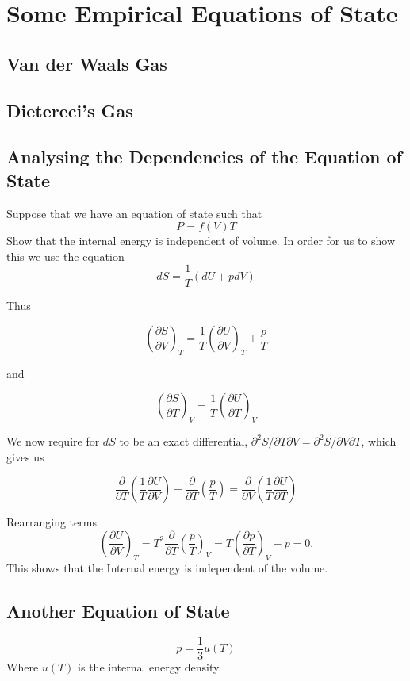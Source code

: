 \documentclass[10pt,twoside,openright]{memoir}
\begin{document}
\section{Some Empirical Equations of State}

\subsection{Van der Waals Gas}

\subsection{Dietereci's Gas}

\subsection{Analysing the Dependencies of the Equation of State}
Suppose that we have an equation of state such that
$$
P = f(V) T
$$
Show that the internal energy is independent of volume. In order for us to show this we use the equation
$$
dS = \frac{1}{T} \left( dU + pdV \right)
$$

Thus

$$
\left( \frac{\partial S}{\partial V} \right)_T 
= \frac{1}{T} \left( \frac{\partial U}{\partial V} \right)_T +  \frac{p}{T}
$$

and

$$
\left( \frac{\partial S}{\partial T} \right)_V 
= \frac{1}{T} \left( \frac{\partial U}{\partial T} \right)_V
$$

We now require for $dS$ to be an exact differential, $\partial^2 S / \partial T \partial V = \partial^2 S / \partial V \partial T$, which gives us

$$
\frac{\partial}{\partial T} \left( \frac{1}{T} \frac{\partial U}{\partial V} \right) + \frac{\partial}{\partial T} \left(  \frac{p}{T} \right) 
= \frac{\partial}{\partial V} \left( \frac{1}{T} \frac{\partial U}{\partial T} \right)
$$

Rearranging terms
$$
\left( \frac{\partial U}{\partial V} \right)_T = T^2 \frac{\partial}{\partial T} \left( \frac{p}{T} \right)_V 
= T \left( \frac{\partial p}{\partial T} \right)_V - p = 0.
$$
This shows that the Internal energy is independent of the volume.

\subsection{Another Equation of State}
$$
p = \frac{1}{3} u(T)
$$
Where $u(T)$ is the internal energy density.
\end{document}
